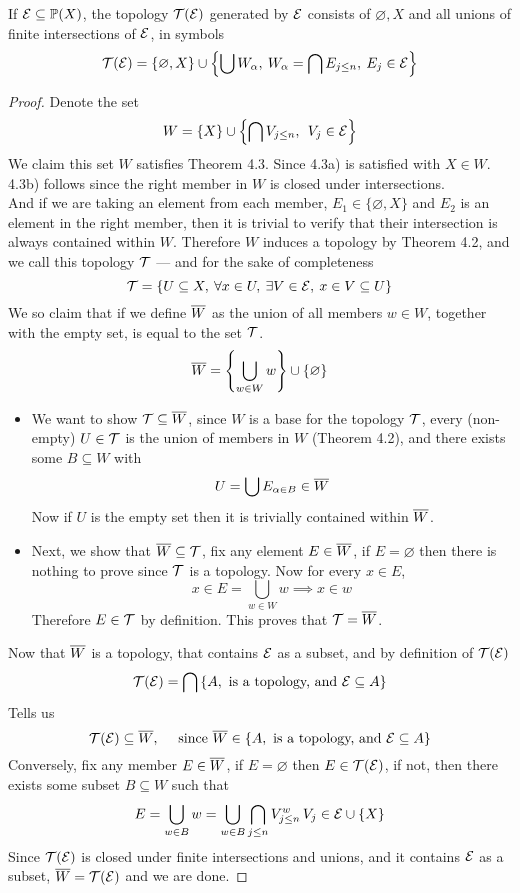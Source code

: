 \documentclass[../../main.tex]{subfiles}
\begin{document}
\begin{wts}
    If $\mathcal{E}\subseteq\mathbb{P}(X)$, the topology $\mathcal{T}(\mathcal{E})$ generated by $\mathcal{E}$ consists of $\varnothing, X$ and all unions of finite intersections of $\mathcal{E}$, in symbols
    \[
    \mathcal{T}(\mathcal{E})=\{\varnothing, X\}\cup\left\{\bigcup W_\alpha,\:W_\alpha = \bigcap E_{j\leq n},\: E_j\in\mathcal{E}\right\}
    \]
\end{wts}
\begin{proof}
    Denote the set
    \[
    W = \{X\}\cup\left\{\bigcap V_{j\leq n},\:\: V_j\in\mathcal{E}\right\}
    \]
    We claim this set $W$ satisfies Theorem 4.3. Since 4.3a) is satisfied with $X\in W$. 4.3b) follows since the right member in $W$ is closed under intersections.\\
    
    And if we are taking an element from each member, $E_1\in\{\varnothing,X\}$ and $E_2$ is an element in the right member, then it is trivial to verify that their intersection is always contained within $W$. Therefore $W$ induces a topology by Theorem 4.2, and we call this topology $\mathcal{T}$ — and for the sake of completeness
    \[
    \mathcal{T} = \left\{U\subseteq X,\: \forall x\in U,\:\exists V\in \mathcal{E}, \: x\in V\subseteq U\right\}
    \]
    We so claim that if we define $\overline{W}$ as the union of all members $w\in W$, together with the empty set, is equal to the set $\mathcal{T}$.
    \[
    \overline{W} = \left\{\bigcup_{w\in W}w\right\}\cup\{\varnothing\}
    \]
    \begin{itemize}
        \item We want to show $\mathcal{T}\subseteq\overline{W}$, since $W$ is a base for the topology $\mathcal{T}$, every (non-empty) $U\in \mathcal{T}$ is the union of members in $W$ (Theorem 4.2), and there exists some $B\subseteq W$ with
        \[
        U=\bigcup E_{\alpha\in B}\in \overline{W}
        \]
        Now if $U$ is the empty set then it is trivially contained within $\overline{W}$.
        \item Next, we show that $\overline{W}\subseteq\mathcal{T}$, fix any element $E\in\overline{W}$, if $E=\varnothing$ then there is nothing to prove since $\mathcal{T}$ is a topology. Now for every $x\in E$,
        \[
        x\in E=\bigcup_{w\in W} w\implies x\in w
        \]
        Therefore $E\in \mathcal{T}$ by definition. This proves that $\mathcal{T} = \overline{W}$.
    \end{itemize}
    Now that $\overline{W}$ is a topology, that contains $\mathcal{E}$ as a subset, and by definition of $\mathcal{T}(\mathcal{E})$
    \[
    \mathcal{T}(\mathcal{E}) = \bigcap \left\{A,\text{ is a topology, and } \mathcal{E}\subseteq A \right\}
    \]
    Tells us
    \[
    \mathcal{T}(\mathcal{E}) \subseteq \overline{W}, \quad\text{ since }\overline{W}\in\left\{A,\text{ is a topology, and } \mathcal{E}\subseteq A \right\}
    \]
    Conversely, fix any member $E\in\overline{W}$, if $E=\varnothing$ then $E\in\mathcal{T}(\mathcal{E})$, if not, then there exists some subset $B\subseteq W$ such that
    \[
    E = \bigcup_{w\in B}w=\bigcup_{w\in B} \bigcap_{j\leq n}V_{j\leq n}^w \, V_j\in \mathcal{E}\cup\{X\}
    \]
    Since $\mathcal{T}(\mathcal{E})$ is closed under finite intersections and unions, and it contains $\mathcal{E}$ as a subset, $\overline{W} = \mathcal{T}(\mathcal{E})$ and we are done.
\end{proof}
\end{document}
